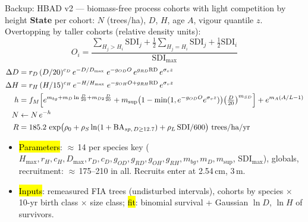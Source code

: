\begin{frame}{Backup: HBAD v2 — biomass-free process cohorts with light competition by height}
\footnotesize
\textbf{State} per cohort: $N$ (trees/ha), $D$, $H$, age $A$, vigour quantile $z$. Overtopping by taller cohorts (relative density units):
\[
O_i=\frac{\sum_{H_j>H_i}\text{SDI}_j+\tfrac12\sum_{H_j=H_i}\text{SDI}_j+\tfrac12\text{SDI}_i}{\text{SDI}_{\max}}
\]
\vspace{-6pt}
\begin{align*}
\Delta D &= r_D\,(D/20)^{c_D}\,e^{-D/D_{\max}}\;e^{-g_{OD}O}\,e^{g_{RD}\text{RD}}\,e^{\sigma_v z}\\
\Delta H &= r_H\,(H/15)^{c_H}\,e^{-H/H_{\max}}\;e^{-g_{OH}O+g_{RH}\text{RD}}\,e^{\sigma_v z}\\
h &= f_M\Bigl[e^{m_{bg}+m_D\ln\frac D{20}+m_{D2}\frac D{20}}+m_{\text{sup}}\bigl(1-\min(1,e^{-g_{OD}O}e^{\sigma_vz})\bigr)\bigl(\tfrac D{20}\bigr)^{m_{SD}}\Bigr]+e^{m_A(A/L-1)}\\
N &\leftarrow N\,e^{-h}\\
R &= 185.2\,\exp\bigl(\rho_0+\rho_S\ln(1+\text{BA}_{sp,\,D\ge12.7})+\rho_L\,\text{SDI}/600\bigr)\ \text{trees/ha/yr}
\end{align*}
\vspace{-4pt}
\begin{itemize}\setlength\itemsep{1pt}
\item \hl{Parameters}: $\approx$\,14 per species key ($H_{\max}, r_H, c_H, D_{\max}, r_D, c_D, g_{OD}, g_{RD}, g_{OH}, g_{RH}, m_{bg}, m_D, m_{\text{sup}}$, SDI$_{\max}$), globals, recruitment: $\approx$\,175–210 in all. Recruits enter at 2.54\,cm, 3\,m.
\item \hl{Inputs}: remeasured FIA trees (undisturbed intervals), cohorts by species $\times$ 10-yr birth class $\times$ size class; \hl{fit}: binomial survival + Gaussian $\ln D$, $\ln H$ of survivors.
\end{itemize}
\end{frame}




